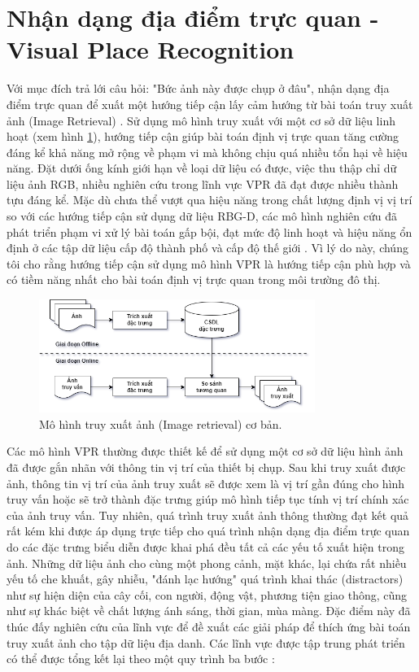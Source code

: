 \section{Nhận dạng địa điểm trực quan - Visual Place Recognition}

Với mục đích trả lới câu hỏi: "Bức ảnh này được chụp ở đâu", nhận dạng địa điểm trực quan để xuất một hướng tiếp cận lấy cảm hướng từ bài toán truy xuất ảnh (Image Retrieval) \cite{2022arXiv220105816X}. Sử dụng mô hình truy xuất với một cơ sở dữ liệu linh hoạt (xem hình \ref{fig:ir}), hướng tiếp cận giúp bài toán định vị trực quan tăng cường đáng kể khả năng mở rộng về phạm vi mà không chịu quá nhiều tổn hại về hiệu năng. Đặt dưới ống kính giới hạn về loại dữ liệu có được, việc thu thập chỉ dữ liệu ảnh RGB, nhiều nghiên cứu trong lĩnh vực VPR đã đạt được nhiều thành tựu đáng kể. Mặc dù chưa thể vượt qua hiệu năng trong chất lượng định vị vị trí so với các hướng tiếp cận sử dụng dữ liệu RBG-D, các mô hình nghiên cứu đã phát triển phạm vi xử lý bài toán gấp bội, đạt mức độ linh hoạt và hiệu năng ổn định ở các tập dữ liệu cấp độ thành phố \cite{alibey2023mixvpr} và cấp độ thế giới \cite{keetha2023anyloc}. Vì lý do này, chúng tôi cho rằng hướng tiếp cận sử dụng mô hình VPR là hướng tiếp cận phù hợp và có tiềm năng nhất cho bài toán định vị trực quan trong môi trường đô thị.

\begin{figure}[H]
    \centering
    \includegraphics[width=0.8\textwidth]{pics/Chapter2/IR.drawio.png}
    \caption[Mô hình truy xuất ảnh cơ bản]{Mô hình truy xuất ảnh (Image retrieval) cơ bản.}
    \label{fig:ir}
\end{figure}

Các mô hình VPR thường được thiết kế để sử dụng một cơ sở dữ liệu hình ảnh đã được gắn nhãn với thông tin vị trí của thiết bị chụp. Sau khi truy xuất được ảnh, thông tin vị trí của ảnh truy xuất sẽ được xem là vị trí gần đúng cho hình truy vấn hoặc sẽ trở thành đặc trưng giúp mô hình tiếp tục tính vị trí chính xác của ảnh truy vấn. Tuy nhiên, quá trình truy xuất ảnh thông thường đạt kết quả rất kém khi được áp dụng trực tiếp cho quá trình nhận dạng địa điểm trực quan do các đặc trưng biểu diễn được khai phá đều tất cả các yếu tố xuất hiện trong ảnh. Những dữ liệu ảnh cho cùng một phong cảnh, mặt khác, lại chứa rất nhiều yếu tố che khuất, gây nhiễu, "đánh lạc hướng" quá trình khai thác (distractors) như sự hiện diện của cây cối, con người, động vật, phương tiện giao thông, cũng như sự khác biệt về chất lượng ánh sáng, thời gian, mùa màng. Đặc điểm này đã thúc đấy nghiên cứu của lĩnh vực để đề xuất các giải pháp để thích ứng bài toán truy xuất ảnh cho tập dữ liệu địa danh. Các lĩnh vực được tập trung phát triển có thể được tổng kết lại theo một quy trình ba bước \cite{Masone2021ASO}:

